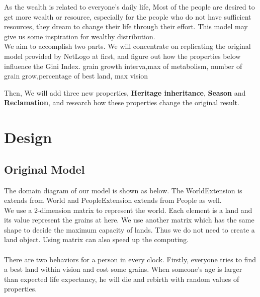 As the wealth is related to everyone’s daily life, Most of the people are desired to get more wealth or resource, especially for the people who do not have sufficient resources, they dream to change their life through their effort. This model may give us some inspiration for wealthy distribution.\\

We aim to accomplish two parts. We will concentrate on replicating the original model provided by NetLogo at first, and figure out how the properties below influence the Gini Index.
	grain growth interva,max of metabolism, number of grain grow,percentage of best land, max vision

Then, We will add three new properties, \textbf{Heritage inheritance}, \textbf{Season} and \textbf{Reclamation}, and research how these properties change the original result.
\section{Design}
\subsection{Original Model}
The domain diagram of our model is shown as below. The WorldExtension is extends from World and PeopleExtension extends from People as well.\\
  [image]
We use a 2-dimension matrix to represent the world. Each element is a land and its value represent the grains at here. We use another matrix which has the same shape to decide the maximum capacity of lands. Thus we do not need to create a land object. Using matrix can also speed up the computing.\\
\\
There are two behaviors for a person in every clock. Firstly, everyone tries to find a best land within vision and cost some grains. When someone's age is larger than expected life expectancy, he will die and rebirth with random values of properties.
